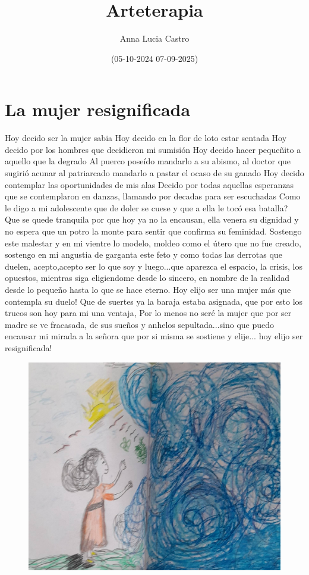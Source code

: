 \documentclass[12pt, a4paper, twoside]{book} %
\author{Anna Lucia Castro}
\title{\textbf{Arteterapia}}
\date{(05-10-2024 07-09-2025)}
\begin{document}
\maketitle
\thispagestyle{empty} %

\tableofcontents

\chapter{La mujer resignificada}

Hoy decido ser la mujer sabia
Hoy decido en la flor de loto estar sentada
Hoy decido por los hombres que decidieron mi sumisión
Hoy decido hacer pequeñito a aquello que la degrado
Al puerco poseído mandarlo a su abismo, al doctor que sugirió acunar al patriarcado mandarlo a pastar el  ocaso de su ganado
Hoy decido contemplar las oportunidades de mis alas
Decido por todas aquellas esperanzas que se contemplaron en danzas, llamando por decadas para  ser escuchadas
Como le digo a mi adolescente que de doler se cuese y que a ella le tocó esa batalla?
Que se quede tranquila por que hoy ya no la encausan, ella venera su dignidad y no espera que un potro la monte para sentir que confirma su feminidad.
Sostengo este malestar y en mi vientre lo modelo, moldeo como el útero que no fue creado, sostengo en mi angustia de garganta este feto y  como todas las derrotas que duelen, acepto,acepto ser lo que soy  y luego...que aparezca el espacio, la crisis, los opuestos, mientras siga eligiendome desde lo sincero, en nombre de la realidad desde lo pequeño hasta lo que se hace eterno.
Hoy elijo ser una mujer más que contempla su duelo! Que de suertes ya la baraja estaba asignada, que por esto los trucos son hoy para mi una ventaja, Por lo menos no seré la mujer que por ser madre se ve fracasada,  de sus sueños y anhelos sepultada...sino que puedo encausar mi mirada a la señora que por si misma se sostiene y elije... hoy elijo  ser resignificada!

\begin{figure}[H]
	\centering
	\includegraphics[width=\textwidth]{./images/1f81324df3940b.jpg}
\end{figure}
\end{document}
